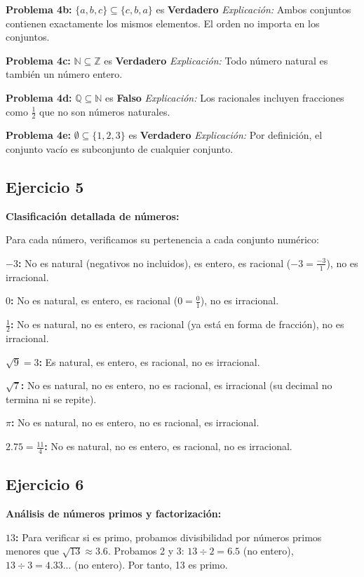 \textbf{Problema 4b:} $\{a, b, c\} \subseteq \{c, b, a\}$ es \textbf{Verdadero}
\textit{Explicación:} Ambos conjuntos contienen exactamente los mismos elementos. El orden no importa en los conjuntos.

\textbf{Problema 4c:} $\mathbb{N} \subseteq \mathbb{Z}$ es \textbf{Verdadero}
\textit{Explicación:} Todo número natural es también un número entero.

\textbf{Problema 4d:} $\mathbb{Q} \subseteq \mathbb{N}$ es \textbf{Falso}
\textit{Explicación:} Los racionales incluyen fracciones como $\frac{1}{2}$ que no son números naturales.

\textbf{Problema 4e:} $\emptyset \subseteq \{1, 2, 3\}$ es \textbf{Verdadero}
\textit{Explicación:} Por definición, el conjunto vacío es subconjunto de cualquier conjunto.

\subsection*{Ejercicio 5}

\textbf{Clasificación detallada de números:}

Para cada número, verificamos su pertenencia a cada conjunto numérico:

\textbf{$-3$:} No es natural (negativos no incluidos), es entero, es racional ($-3 = \frac{-3}{1}$), no es irracional.

\textbf{$0$:} No es natural, es entero, es racional ($0 = \frac{0}{1}$), no es irracional.

\textbf{$\frac{1}{2}$:} No es natural, no es entero, es racional (ya está en forma de fracción), no es irracional.

\textbf{$\sqrt{9} = 3$:} Es natural, es entero, es racional, no es irracional.

\textbf{$\sqrt{7}$:} No es natural, no es entero, no es racional, es irracional (su decimal no termina ni se repite).

\textbf{$\pi$:} No es natural, no es entero, no es racional, es irracional.

\textbf{$2.75 = \frac{11}{4}$:} No es natural, no es entero, es racional, no es irracional.

\subsection*{Ejercicio 6}

\textbf{Análisis de números primos y factorización:}

\textbf{$13$:} Para verificar si es primo, probamos divisibilidad por números primos menores que $\sqrt{13} \approx 3.6$. Probamos 2 y 3: $13 \div 2 = 6.5$ (no entero), $13 \div 3 = 4.33...$ (no entero). Por tanto, 13 es primo.

